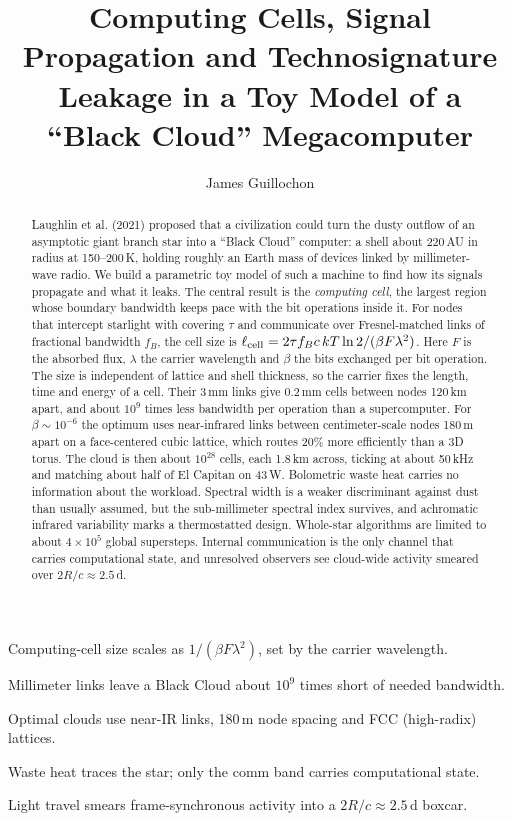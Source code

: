 \documentclass[final,5p]{elsarticle}
\begin{document}
\begin{frontmatter}

\title{Computing Cells, Signal Propagation and Technosignature Leakage in a Toy Model of a ``Black Cloud'' Megacomputer}

\author{James Guillochon}

\begin{abstract}
Laughlin et al. (2021) proposed that a civilization could turn the dusty outflow of an asymptotic giant branch star into a ``Black Cloud'' computer: a shell about 220\,AU in radius at 150--200\,K, holding roughly an Earth mass of devices linked by millimeter-wave radio. We build a parametric toy model of such a machine to find how its signals propagate and what it leaks. The central result is the \emph{computing cell}, the largest region whose boundary bandwidth keeps pace with the bit operations inside it. For nodes that intercept starlight with covering $\tau$ and communicate over Fresnel-matched links of fractional bandwidth $f_B$, the cell size is $\ell_{\rm cell} = 2\tau f_B c\,kT\ln 2/(\beta F\lambda^2)$. Here $F$ is the absorbed flux, $\lambda$ the carrier wavelength and $\beta$ the bits exchanged per bit operation. The size is independent of lattice and shell thickness, so the carrier fixes the length, time and energy of a cell. Their 3\,mm links give 0.2\,mm cells between nodes 120\,km apart, and about $10^9$ times less bandwidth per operation than a supercomputer. For $\beta \sim 10^{-6}$ the optimum uses near-infrared links between centimeter-scale nodes 180\,m apart on a face-centered cubic lattice, which routes 20\% more efficiently than a 3D torus. The cloud is then about $10^{28}$ cells, each 1.8\,km across, ticking at about 50\,kHz and matching about half of El Capitan on 43\,W. Bolometric waste heat carries no information about the workload. Spectral width is a weaker discriminant against dust than usually assumed, but the sub-millimeter spectral index survives, and achromatic infrared variability marks a thermostatted design. Whole-star algorithms are limited to about $4\times10^5$ global supersteps. Internal communication is the only channel that carries computational state, and unresolved observers see cloud-wide activity smeared over $2R/c \approx 2.5$\,d.
\end{abstract}

\begin{highlights}
\item Computing-cell size scales as $1/(\beta F\lambda^2)$, set by the carrier wavelength.
\item Millimeter links leave a Black Cloud about $10^{9}$ times short of needed bandwidth.
\item Optimal clouds use near-IR links, 180\,m node spacing and FCC (high-radix) lattices.
\item Waste heat traces the star; only the comm band carries computational state.
\item Light travel smears frame-synchronous activity into a $2R/c\approx2.5$\,d boxcar.
\end{highlights}


\end{frontmatter}
\end{document}
